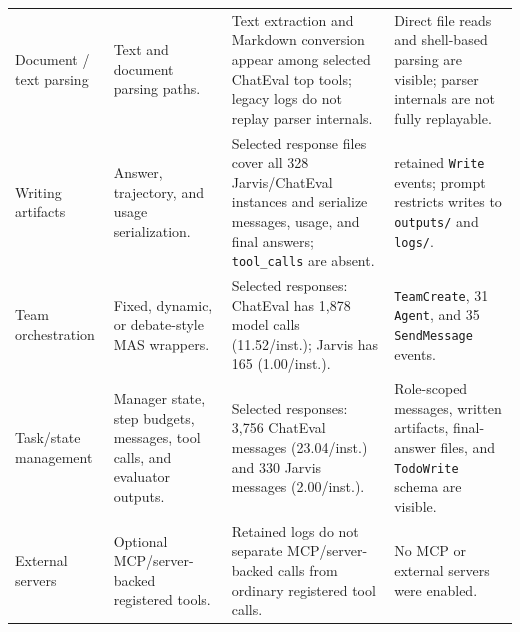 \begin{table}[t]
{\begin{tabular}{>{\raggedright\arraybackslash}p{} >{\raggedright\arraybackslash}p{} >{\raggedright\arraybackslash}p{} >{\raggedright\arraybackslash}p{}}
Document / text parsing & Text and document parsing paths. & Text extraction and Markdown conversion appear among selected ChatEval top tools; legacy logs do not replay parser internals. & Direct file reads and shell-based parsing are visible; parser internals are not fully replayable. \\
Writing artifacts & Answer, trajectory, and usage serialization. & Selected response files cover all 328 Jarvis/ChatEval instances and serialize messages, usage, and final answers; \texttt{tool\_calls} are absent. & 65 retained \texttt{Write} events; prompt restricts writes to \texttt{outputs/} and \texttt{logs/}. \\
Team orchestration & Fixed, dynamic, or debate-style MAS wrappers. & Selected responses: ChatEval has 1{,}878 model calls (11.52/inst.); Jarvis has 165 (1.00/inst.). & 7 \texttt{TeamCreate}, 31 \texttt{Agent}, and 35 \texttt{SendMessage} events. \\
Task/state management & Manager state, step budgets, messages, tool calls, and evaluator outputs. & Selected responses: 3{,}756 ChatEval messages (23.04/inst.) and 330 Jarvis messages (2.00/inst.). & Role-scoped messages, written artifacts, final-answer files, and \texttt{TodoWrite} schema are visible. \\
External servers & Optional MCP/server-backed registered tools. & Retained logs do not separate MCP/server-backed calls from ordinary registered tool calls. & No MCP or external servers were enabled. \\
\bottomrule
\end{tabular}
}
\renewcommand{\arraystretch}{1.0}
\end{table}

